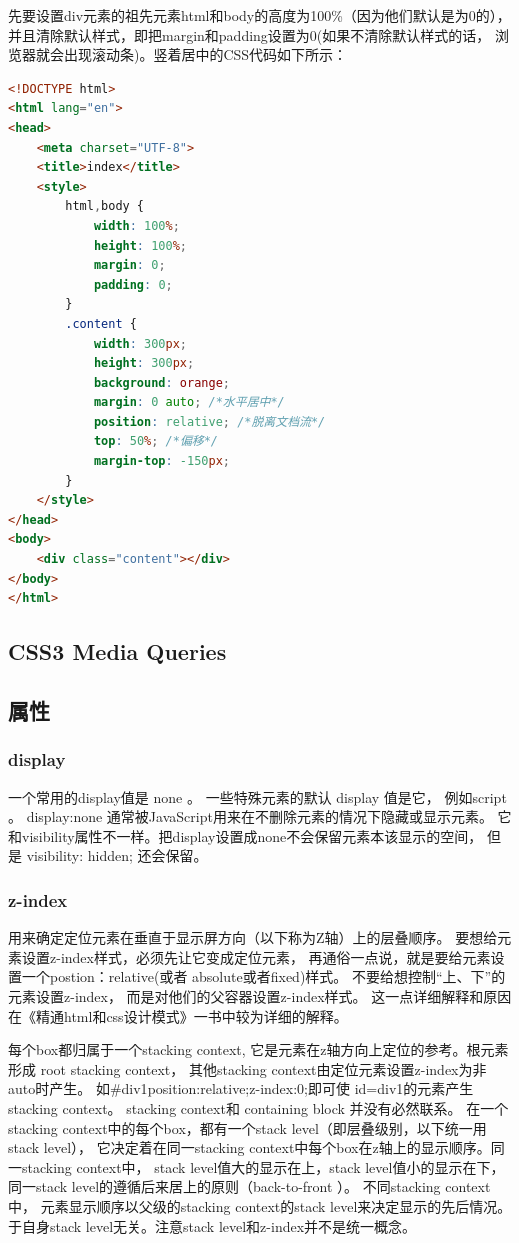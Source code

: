 \documentclass{book}
\begin{document}
先要设置div元素的祖先元素html和body的高度为100\%（因为他们默认是为0的），
并且清除默认样式，即把margin和padding设置为0(如果不清除默认样式的话，
浏览器就会出现滚动条)。竖着居中的CSS代码如下所示：

\begin{lstlisting}[language=HTML]
<!DOCTYPE html>
<html lang="en">
<head>
    <meta charset="UTF-8">
    <title>index</title>
    <style>
        html,body {
            width: 100%;
            height: 100%;
            margin: 0;
            padding: 0;
        }
        .content {
            width: 300px;
            height: 300px;
            background: orange;
            margin: 0 auto; /*水平居中*/
            position: relative; /*脱离文档流*/
            top: 50%; /*偏移*/
            margin-top: -150px;
        }
    </style>
</head>
<body>
    <div class="content"></div>
</body>
</html>
\end{lstlisting}


\subsection{CSS3 Media Queries}

\subsection{属性}

\subsubsection{display}

一个常用的display值是 none 。
一些特殊元素的默认 display 值是它，
例如script 。 display:none 通常被JavaScript用来在不删除元素的情况下隐藏或显示元素。
它和visibility属性不一样。把display设置成none不会保留元素本该显示的空间，
但是 visibility: hidden; 还会保留。 

\subsubsection{z-index}

用来确定定位元素在垂直于显示屏方向（以下称为Z轴）上的层叠顺序。
要想给元素设置z-index样式，必须先让它变成定位元素，
再通俗一点说，就是要给元素设置一个postion：relative(或者 absolute或者fixed)样式。
不要给想控制“上、下”的元素设置z-index，
而是对他们的父容器设置z-index样式。
这一点详细解释和原因在《精通html和css设计模式》一书中较为详细的解释。

每个box都归属于一个stacking context,
它是元素在z轴方向上定位的参考。根元素形成 root stacking context，
其他stacking context由定位元素设置z-index为非auto时产生。
如\#div1{position:relative;z-index:0;}即可使 id=div1的元素产生stacking context。
stacking context和 containing block 并没有必然联系。
在一个stacking context中的每个box，都有一个stack level（即层叠级别，以下统一用stack level），
它决定着在同一stacking context中每个box在z轴上的显示顺序。同一stacking context中，
stack level值大的显示在上，stack level值小的显示在下，
同一stack level的遵循后来居上的原则（back-to-front ）。
不同stacking context中，
元素显示顺序以父级的stacking context的stack level来决定显示的先后情况。
于自身stack level无关。注意stack level和z-index并不是统一概念。
\end{document}
